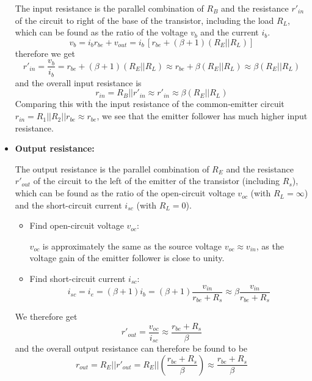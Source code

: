 \documentclass{article}
\begin{document}
\begin{itemize}
  The input resistance is the parallel combination of $R_B$ and the
  resistance $r'_{in}$ of the circuit to right of the base of the 
  transistor, including the load $R_L$, which can be found as the 
  ratio of the voltage $v_b$ and the current $i_b$. 
  \begin{equation}
  v_b=i_b r_{be}+v_{out}=i_b\, [ r_{be}+(\beta+1)(R_E||R_L) ]
  \end{equation}
  therefore we get
  \begin{equation}
  r'_{in}=\frac{v_b}{i_b}=r_{be}+(\beta+1) (R_E||R_L)
  \approx r_{be}+\beta (R_E||R_L)\approx \beta (R_E||R_L)
  \end{equation}
  and the overall input resistance is
  \begin{equation}
  r_{in}=R_B||r'_{in} \approx r'_{in}\approx \beta (R_E||R_L)
  \end{equation}
  Comparing this with the input resistance of the common-emitter circuit
  $r_{in}=R_1||R_2|| r_{be} \approx r_{be}$, we see that the emitter follower 
  has much higher input resistance.


\item {\bf Output resistance:}

  The output resistance is the parallel combination of $R_E$ and the 
  resistance $r'_{out}$ of the circuit to the left of the emitter of the
  transistor (including $R_s$), which can  be found as the ratio of the 
  open-circuit voltage $v_{oc}$ (with $R_L=\infty$) and the short-circuit 
  current $i_{sc}$ (with $R_L=0$). 
  \begin{itemize}
  \item Find open-circuit voltage $v_{oc}$: 

    $v_{oc}$ is approximately the same as the source voltage $v_{oc}\approx v_{in}$,
    as the voltage gain of the emitter follower is close to unity.

  \item Find short-circuit current $i_{sc}$:
    \begin{equation}
    i_{sc}=i_e=(\beta+1)i_b=(\beta+1)\frac{v_{in}}{r_{be}+R_s}
    \approx \beta \frac{v_{in}}{r_{be}+R_s}
    \end{equation}
  \end{itemize}
  We therefore get
  \begin{equation}
  r'_{out}=\frac{v_{oc}}{i_{sc}} \approx\frac{r_{be}+R_s}{\beta} 
  \end{equation}
  and the overall output resistance can therefore be found to be
  \begin{equation}
  r_{out}= R_E || r'_{out}=R_E || \left(\frac{r_{be}+R_s}{\beta}\right)
  \approx \frac{r_{be}+R_s}{\beta}	
  \end{equation}

\end{itemize}
\end{document}
